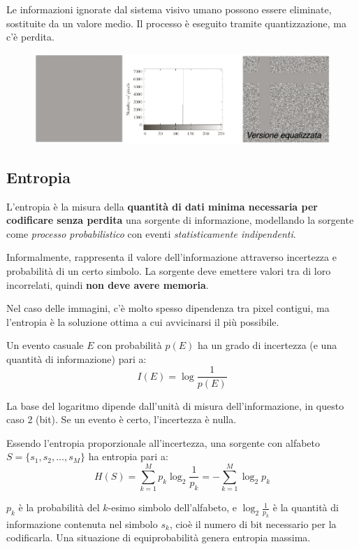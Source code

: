 Le informazioni ignorate dal sistema visivo umano possono essere eliminate, sostituite da un valore medio. Il processo è eseguito tramite quantizzazione, ma c'è perdita. 

\begin{figure}[h]
	\centering
	\includegraphics[scale=0.4]{Lezioni/Immagini/ridondanzapercettiva}
\end{figure}

\subsection{Entropia}
L'entropia è la misura della \textbf{quantità di dati minima necessaria per codificare senza perdita} una sorgente di informazione, modellando la sorgente come \textit{processo probabilistico} con eventi \textit{statisticamente indipendenti}.

Informalmente, rappresenta il valore dell'informazione attraverso incertezza e probabilità di un certo simbolo. La sorgente deve emettere valori tra di loro incorrelati, quindi \textbf{non deve avere memoria}. 

Nel caso delle immagini, c'è molto spesso dipendenza tra pixel contigui, ma l'entropia è la soluzione ottima a cui avvicinarsi il più possibile.

Un evento casuale $E$ con probabilità $p(E)$ ha un grado di incertezza (e una quantità di informazione) pari a:
$$I(E) = \log \frac{1}{p(E)}$$

La base del logaritmo dipende dall'unità di misura dell'informazione, in questo caso 2 (bit). Se un evento è certo, l'incertezza è nulla. 

Essendo l'entropia proporzionale all'incertezza, una sorgente con alfabeto $S = \{s_1, s_2, \dots,s_M\}$ ha entropia pari a:
$$H(S) = \sum_{k=1}^{M} p_k \log_2 \frac{1}{p_k} = -\sum_{k=1}^{M}\log_2p_k$$

$p_k$ è la probabilità del $k$-esimo simbolo dell'alfabeto, e $\log_2\frac{1}{p_k}$ è la quantità di informazione contenuta nel simbolo $s_k$, cioè il numero di bit necessario per la codificarla. Una situazione di equiprobabilità genera entropia massima.

